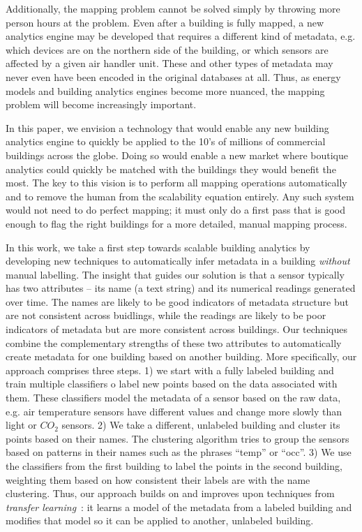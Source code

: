 Additionally, the mapping problem cannot be solved simply by throwing more
person hours at the problem. Even after a building is fully mapped, a new
analytics engine may be developed that requires a different kind of metadata,
e.g. which devices are on the northern side of the building, or which sensors
are affected by a given air handler unit. These and other types of metadata may
never even have been encoded in the original databases at all. Thus, as energy
models and building analytics engines become more nuanced, the mapping problem
will become increasingly important.

In this paper, we envision a technology that would enable any new building
analytics engine to quickly be applied to the 10's of millions of commercial
buildings across the globe. Doing so would enable a new market where boutique
analytics could quickly be matched with the buildings they would benefit the
most. The key to this vision is to perform all mapping operations automatically
and to remove the human from the scalability equation entirely. Any such system
would not need to do perfect mapping; it must only do a first pass that is good
enough to flag the right buildings for a more detailed, manual mapping process.

In this work, we take a first step towards scalable building analytics by
developing new techniques to automatically infer metadata in a building {\em
  without} manual labelling. The insight that guides our solution is that a
sensor typically has two attributes -- its name (a text string) and its
numerical readings generated over time. The names are likely to be good
indicators of metadata structure but are not consistent across buidlings, while
the readings are likely to be poor indicators of metadata but are more
consistent across buildings. Our techniques combine the complementary strengths
of these two attributes to automatically create metadata for one building based
on another building. More specifically, our approach comprises three steps. 1) we start
with a fully labeled building and train multiple classifiers o label new points
based on the data associated with them. These classifiers model the metadata of a
sensor based on the raw data, e.g. air temperature sensors have different values
and change more slowly than light or $CO_2$ sensors. 2) We take a different,
unlabeled building and cluster its points based on their names. The clustering
algorithm tries to group the sensors based on patterns in their names such as
the phrases ``temp'' or ``occ''. 3) We use the classifiers from the first
building to label the points in the second building, weighting them based on how
consistent their labels are with the name clustering. Thus, our approach builds
on and improves upon techniques from {\em transfer learning}~\cite{lwe}: it
learns a model of the metadata from a labeled building and modifies that model
so it can be applied to another, unlabeled building.

